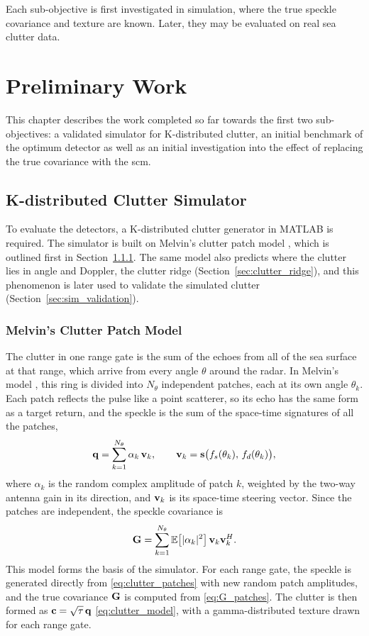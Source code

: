 \documentclass[12pt, a4paper]{report}
\begin{document}
Each sub-objective is first investigated in simulation, where the true speckle covariance and texture are known. Later, they may be evaluated on real sea clutter data.

\newpage
\chapter{Preliminary Work}
\label{ch:preliminary_work}
This chapter describes the work completed so far towards the first two sub-objectives: a validated simulator for K-distributed clutter, an initial benchmark of the optimum detector as well as an initial investigation into the effect of replacing the true covariance with the \gls{scm}.

\section{K-distributed Clutter Simulator}\label{sec:simulator}
To evaluate the detectors, a K-distributed clutter generator in MATLAB is required. The simulator is built on Melvin's clutter patch model \cite{Melvin2004}, which is outlined first in Section~\ref{sec:melvins_model}. The same model also predicts where the clutter lies in angle and Doppler, the clutter ridge (Section~\ref{sec:clutter_ridge}), and this phenomenon is later used to validate the simulated clutter (Section~\ref{sec:sim_validation}).

\subsection{Melvin's Clutter Patch Model}
\label{sec:melvins_model}
The clutter in one range gate is the sum of the echoes from all of the sea surface at that range, which arrive from every angle $\theta$ around the radar. In Melvin's model \cite{Melvin2004}, this ring is divided into $N_\theta$ independent patches, each at its own angle $\theta_k$. Each patch reflects the pulse like a point scatterer, so its echo has the same form as a target return, and the speckle is the sum of the space-time signatures of all the patches,
\begin{equation}
    \vb q = \sum_{k=1}^{N_\theta} \alpha_k\, \vb v_k,
    \qquad \vb v_k = \vb s\big(f_s(\theta_k),\, f_d(\theta_k)\big),
    \label{eq:clutter_patches}
\end{equation}
where $\alpha_k$ is the random complex amplitude of patch $k$, weighted by the two-way antenna gain in its direction, and $\vb v_k$ is its space-time steering vector. Since the patches are independent, the speckle covariance is
\begin{equation}
    \mathbf{G} = \sum_{k=1}^{N_\theta} \mathbb{E}\!\left[|\alpha_k|^2\right]\vb v_k\vb v_k^H.
    \label{eq:G_patches}
\end{equation}
This model forms the basis of the simulator. For each range gate, the speckle is generated directly from \eqref{eq:clutter_patches} with new random patch amplitudes, and the true covariance $\mathbf{G}$ is computed from \eqref{eq:G_patches}. The clutter is then formed as $\vb c=\sqrt{\tau}\,\vb q$ \eqref{eq:clutter_model}, with a gamma-distributed texture drawn for each range gate.
\end{document}
